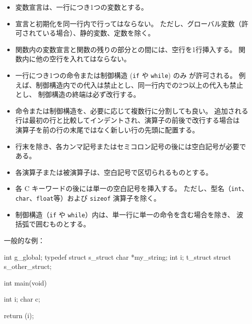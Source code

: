 \documentclass{42-ja}
\begin{document}
\begin{itemize}
            \item 変数宣言は、一行につき1つの変数とする。

            \item 宣言と初期化を同一行内で行ってはならない。
              ただし、グローバル変数（許可されている場合）、静的変数、定数を除く。

            \item 関数内の変数宣言と関数の残りの部分との間には、空行を1行挿入する。
              関数内に他の空行を入れてはならない。

            \item 一行につき1つの命令または制御構造 (\texttt{if} や \texttt{while}) のみ
              が許可される。
              例えば、制御構造内での代入は禁止とし、同一行内での2つ以上の代入も禁止とし、
              制御構造の終端は必ず改行する。

            \item 命令または制御構造を、必要に応じて複数行に分割しても良い。
              追加される行は最初の行と比較してインデントされ、演算子の前後で改行する場合は
              演算子を前の行の末尾ではなく新しい行の先頭に配置する。

            \item 行末を除き、各カンマ記号またはセミコロン記号の後には空白記号が必要である。

            \item 各演算子または被演算子は、空白記号で区切られるものとする。

            \item 各 C キーワードの後には単一の空白記号を挿入する。
              ただし、型名（\texttt{int}、\texttt{char}、\texttt{float}等）および \texttt{sizeof} 演算子を除く。

            \item 制御構造（\texttt{if} や \texttt{while}）内は、単一行に単一の命令を含む場合を除き、
              波括弧で囲むものとする。

            \end{itemize}

\vspace{1cm}

            一般的な例：
            \begin{42ccode}
int             g_global;
typedef struct  s_struct
{
    char    *my_string;
    int     i;
}               t_struct
struct          s_other_struct;

int     main(void)
{
    int     i;
    char    c;

    return (i);
}
            \end{42ccode}
            \newpage
\end{document}

